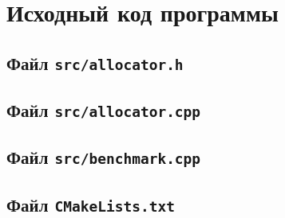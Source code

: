 \documentclass[unicode, 12pt, a4paper, oneside, fleqn]{article}
\begin{document}
\clearpage
\section{Исходный код программы}

\subsection{Файл \texttt{src/allocator.h}}

\begin{center}

\end{center}

\subsection{Файл \texttt{src/allocator.cpp}}

\begin{center}

\end{center}

\subsection{Файл \texttt{src/benchmark.cpp}}

\begin{center}

\end{center}

\subsection{Файл \texttt{CMakeLists.txt}}

\begin{center}

\end{center}
\end{document}
